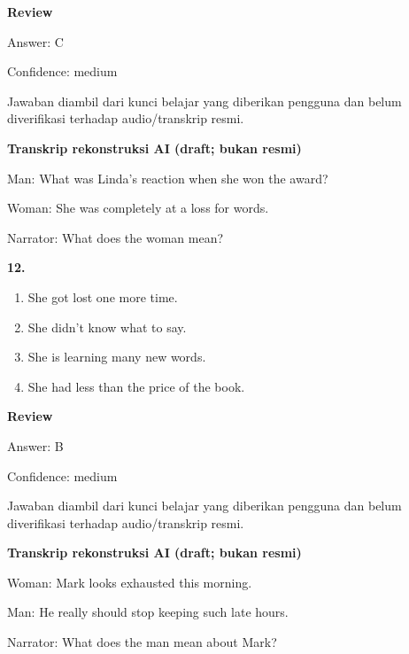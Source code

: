\documentclass[12pt]{article}
\begin{document}
\par
\begingroup
\setlength{\parskip}{0pt}
\setlength{\parindent}{0pt}
\textbf{Review}\par
Answer: C\par
Confidence: medium\par
Jawaban diambil dari kunci belajar yang diberikan pengguna dan belum diverifikasi terhadap audio/transkrip resmi.\par
\endgroup
\par
\vspace{0.25\baselineskip}
\begin{exampleblock}
\textbf{Transkrip rekonstruksi AI (draft; bukan resmi)}\par
Man: What was Linda's reaction when she won the award?\par
Woman: She was completely at a loss for words.\par
Narrator: What does the woman mean?\par
\end{exampleblock}
\noindent\textbf{12.}
\begin{enumerate}[label=(\Alph*),leftmargin=*,itemsep=0.2em]
\item She got lost one more time.
\item She didn't know what to say.
\item She is learning many new words.
\item She had less than the price of the book.
\end{enumerate}
\par
\begingroup
\setlength{\parskip}{0pt}
\setlength{\parindent}{0pt}
\textbf{Review}\par
Answer: B\par
Confidence: medium\par
Jawaban diambil dari kunci belajar yang diberikan pengguna dan belum diverifikasi terhadap audio/transkrip resmi.\par
\endgroup
\par
\vspace{0.25\baselineskip}
\begin{exampleblock}
\textbf{Transkrip rekonstruksi AI (draft; bukan resmi)}\par
Woman: Mark looks exhausted this morning.\par
Man: He really should stop keeping such late hours.\par
Narrator: What does the man mean about Mark?\par
\end{exampleblock}
\end{document}
